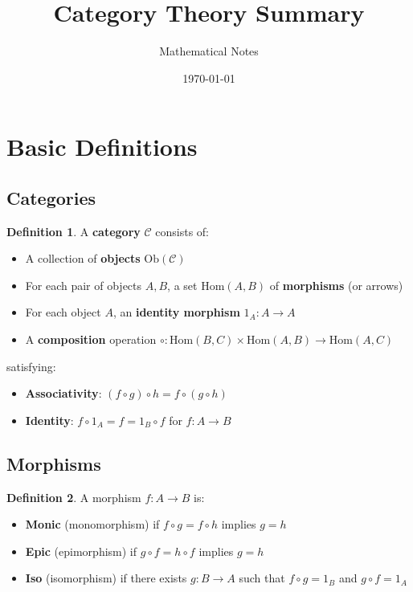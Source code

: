 \documentclass[11pt]{article}
\title{Category Theory Summary}
\author{Mathematical Notes}
\date{\today}
\theoremstyle{definition}
\newtheorem{definition}{Definition}[section]
\begin{document}
\maketitle

\tableofcontents
\newpage

\section{Basic Definitions}

\subsection{Categories}
\begin{definition}
A \textbf{category} $\mathcal{C}$ consists of:
\begin{itemize}
    \item A collection of \textbf{objects} $\text{Ob}(\mathcal{C})$
    \item For each pair of objects $A, B$, a set $\text{Hom}(A,B)$ of \textbf{morphisms} (or arrows)
    \item For each object $A$, an \textbf{identity morphism} $1_A: A \to A$
    \item A \textbf{composition} operation $\circ: \text{Hom}(B,C) \times \text{Hom}(A,B) \to \text{Hom}(A,C)$
\end{itemize}
satisfying:
\begin{itemize}
    \item \textbf{Associativity}: $(f \circ g) \circ h = f \circ (g \circ h)$
    \item \textbf{Identity}: $f \circ 1_A = f = 1_B \circ f$ for $f: A \to B$
\end{itemize}
\end{definition}

\subsection{Morphisms}
\begin{definition}
A morphism $f: A \to B$ is:
\begin{itemize}
    \item \textbf{Monic} (monomorphism) if $f \circ g = f \circ h$ implies $g = h$
    \item \textbf{Epic} (epimorphism) if $g \circ f = h \circ f$ implies $g = h$
    \item \textbf{Iso} (isomorphism) if there exists $g: B \to A$ such that $f \circ g = 1_B$ and $g \circ f = 1_A$
\end{itemize}
\end{definition}
\end{document}
